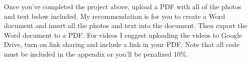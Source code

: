 Once you've completed the project above, upload a PDF with all of the photos and text
below included. My recommendation is for you to create a Word document
and insert all the photos and text into the document. Then export the
Word document to a PDF. For videos I suggest uploading the videos to
Google Drive, turn on link sharing and include a link in your
PDF. Note that all code must be included in the appendix or you'll be
penalized 10\%. 
